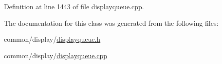 Definition at line 1443 of file displayqueue.\+cpp.


\begin{DoxyCode}{0}
\end{DoxyCode}


The documentation for this class was generated from the following files\+:\begin{DoxyCompactItemize}
\item 
common/display/\mbox{\hyperlink{displayqueue_8h}{displayqueue.\+h}}\item 
common/display/\mbox{\hyperlink{displayqueue_8cpp}{displayqueue.\+cpp}}\end{DoxyCompactItemize}
